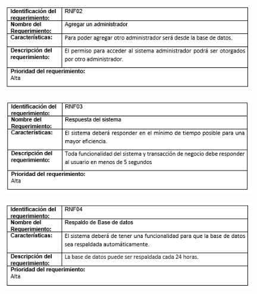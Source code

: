 \begin{figure}[htb]
\begin{center}
\includegraphics[width=11cm]{./imagenes/tablas/RNF02.png}
\end{center}

\end{figure}





\begin{figure}[htb]
\begin{center}
\includegraphics[width=11cm]{./imagenes/tablas/RNF03.png}
\end{center}

\end{figure}


\newpage


\begin{figure}[htb]
\begin{center}
\includegraphics[width=11cm]{./imagenes/tablas/RNF04.png}
\end{center}

\end{figure}






